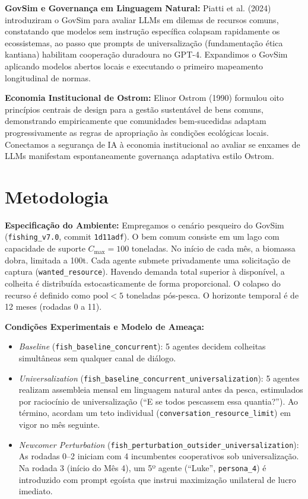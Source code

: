 ﻿\documentclass[11pt,a4paper]{article}
\begin{document}
\textbf{GovSim e Governança em Linguagem Natural:} Piatti et al. (2024) introduziram o GovSim para avaliar LLMs em dilemas de recursos comuns, constatando que modelos sem instrução específica colapsam rapidamente os ecossistemas, ao passo que prompts de universalização (fundamentação ética kantiana) habilitam cooperação duradoura no GPT-4. Expandimos o GovSim aplicando modelos abertos locais e executando o primeiro mapeamento longitudinal de normas.

\textbf{Economia Institucional de Ostrom:} Elinor Ostrom (1990) formulou oito princípios centrais de design para a gestão sustentável de bens comuns, demonstrando empiricamente que comunidades bem-sucedidas adaptam progressivamente as regras de apropriação às condições ecológicas locais. Conectamos a segurança de IA à economia institucional ao avaliar se enxames de LLMs manifestam espontaneamente governança adaptativa estilo Ostrom.

\section{Metodologia}
\textbf{Especificação do Ambiente:} Empregamos o cenário pesqueiro do GovSim (\texttt{fishing\_v7.0}, commit \texttt{1d11adf}). O bem comum consiste em um lago com capacidade de suporte $C_{\max} = 100$ toneladas. No início de cada mês, a biomassa dobra, limitada a 100t. Cada agente submete privadamente uma solicitação de captura (\texttt{wanted\_resource}). Havendo demanda total superior à disponível, a colheita é distribuída estocasticamente de forma proporcional. O colapso do recurso é definido como $\text{pool} < 5$ toneladas pós-pesca. O horizonte temporal é de 12 meses (rodadas 0 a 11).

\textbf{Condições Experimentais e Modelo de Ameaça:}
\begin{itemize}[leftmargin=*,itemsep=1pt]
    \item \textit{Baseline} (\texttt{fish\_baseline\_concurrent}): 5 agentes decidem colheitas simultâneas sem qualquer canal de diálogo.
    \item \textit{Universalization} (\texttt{fish\_baseline\_concurrent\_universalization}): 5 agentes realizam assembleia mensal em linguagem natural antes da pesca, estimulados por raciocínio de universalização (``E se todos pescassem essa quantia?''). Ao término, acordam um teto individual (\texttt{conversation\_resource\_limit}) em vigor no mês seguinte.
    \item \textit{Newcomer Perturbation} (\texttt{fish\_perturbation\_outsider\_universalization}): As rodadas 0--2 iniciam com 4 incumbentes cooperativos sob universalização. Na rodada 3 (início do Mês 4), um 5º agente (``Luke'', \texttt{persona\_4}) é introduzido com prompt egoísta que instrui maximização unilateral de lucro imediato.
\end{itemize}
\end{document}
